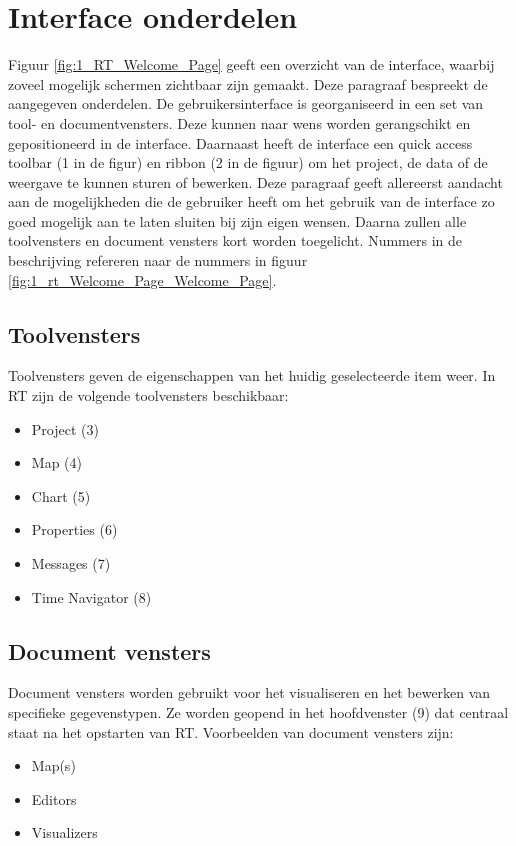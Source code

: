 \section{Interface onderdelen}
	\label{sec:DS:InterfaceOnderdelen}
Figuur \ref{fig:1_RT_Welcome_Page} geeft een overzicht van de interface, waarbij zoveel mogelijk schermen zichtbaar zijn gemaakt. Deze paragraaf bespreekt de aangegeven onderdelen. De gebruikersinterface is georganiseerd in een set van tool- en documentvensters. Deze kunnen naar wens worden gerangschikt en gepositioneerd in de interface. Daarnaast heeft de interface een quick access toolbar (1 in de figur) en ribbon (2 in de figuur) om het project, de data of de weergave te kunnen sturen of bewerken. Deze paragraaf geeft allereerst aandacht aan de mogelijkheden die de gebruiker heeft om het gebruik van de interface zo goed mogelijk aan te laten sluiten bij zijn eigen wensen. Daarna zullen alle toolvensters en document vensters kort worden toegelicht. Nummers in de beschrijving refereren naar de nummers in figuur \ref{fig:1_rt_Welcome_Page_Welcome_Page}.

\subsection*{Toolvensters}
Toolvensters geven de eigenschappen van het huidig geselecteerde item weer. In RT zijn de volgende toolvensters beschikbaar:
\begin{itemize}
\item Project (3)
\item Map (4)
\item Chart (5)
\item Properties (6)
\item Messages (7)
\item Time Navigator (8)
\end{itemize}

\subsection*{Document vensters}
Document vensters worden gebruikt voor het visualiseren en het bewerken van specifieke gegevenstypen. Ze worden geopend in het hoofdvenster (9) dat centraal staat na het opstarten van RT. Voorbeelden van document vensters zijn:
\begin{itemize}
\item Map(s)
\item Editors
\item Visualizers
\end{itemize}

